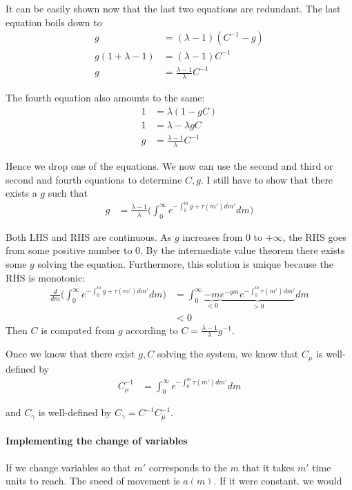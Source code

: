 \documentclass[12pt,english]{article}
\theoremstyle{remark}
\begin{document}
It can be easily shown now that the last two equations are redundant. The last equation boils down to 
\begin{align*}
	g &= (\lambda -1) (C^{-1} - g) \\
	g (1 + \lambda - 1) &= (\lambda -1) C^{-1} \\ 
	g &= \frac{\lambda -1}{\lambda} C^{-1}  
\end{align*}

The fourth equation also amounts to the same:
\begin{align*}
	1 &= \lambda(1 - gC) \\
	1 &= \lambda - \lambda g C\\
	g &= \frac{\lambda -1}{\lambda } C^{-1}
\end{align*}

Hence we drop one of the equations. We now can use the second and third or second and fourth equations to determine $C,g$. I still have to show that there exists a $g$ such that
\begin{align*}
	g &= \frac{\lambda -1}{\lambda} \Big( \int_{0}^{\infty} e^{-\int_0^m g + \tau(m') dm'} dm  \Big)
\end{align*}

Both LHS and RHS are continuous. As $g$ increases from $0$ to $+\infty$, the RHS goes from some positive number to 0. By the intermediate value theorem there exists some $g$ solving the equation. Furthermore, this solution is unique because the RHS is monotonic: 
\begin{align*}
	\frac{d}{dm} \Big( \int_{0}^{\infty} e^{-\int_0^m g + \tau(m') dm'} dm  \Big) &= \int_0^{\infty} \underbrace{-m}_{<0}\underbrace{e^{-gm} e^{-\int_0^m \tau(m') dm'}}_{> 0} dm  \\
	      &< 0
\end{align*}Then $C$ is computed from $g$ according to $C = \frac{\lambda - 1}{\lambda} g^{-1}$. 

Once we know that there exist $g,C$ solving the system, we know that $C_{\mu}$ is well-defined by 
\begin{align*}
	C_{\mu}^{-1} &=\int_0^{\infty} e^{-\int_0^m \tau(m')dm'} dm
\end{align*}

and $C_{\gamma}$ is well-defined by $C_{\gamma} = C^{-1} C_{\mu}^{-1}$. 

\paragraph{Implementing the change of variables}
If we change variables so that $m'$ corresponds to the $m$ that it takes $m'$ time units to reach. The speed of movement is $a(m)$. If it were constant, we would want $m' = m/a$. After $dt$ seconds, the particle moves to $dm = a(m)dt$. So $dt = dm/a(m)$, i.e. $\frac{dt}{dm} = a(t)^{-1}$. Hence, 
\begin{align*}
	t(m) &= \int_0^m \frac{dt}{dm} dm \\
	     &= \int_0^m a(m)^{-1} dm
\end{align*}  
\end{document}
